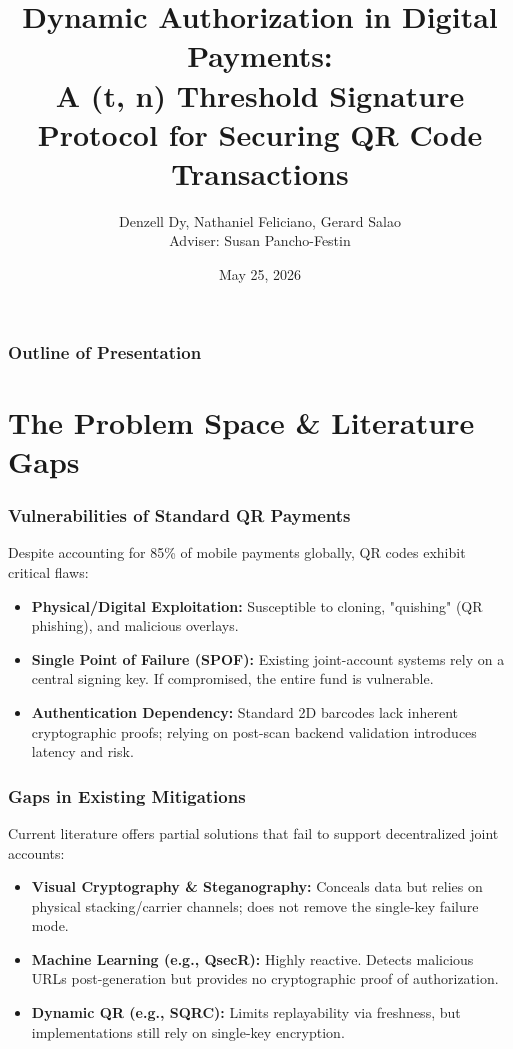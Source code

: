 \documentclass{beamer}
\title[Dynamic Authorization in Digital Payments]{Dynamic Authorization in Digital Payments: \\ A (t, n) Threshold Signature Protocol for Securing QR Code Transactions}
\author[Dy, Feliciano, Salao]{Denzell Dy, Nathaniel Feliciano, Gerard Salao \\ Adviser: Susan Pancho-Festin}
\institute[CSL - UP Diliman]{Computer Security Laboratory - Department of Computer Science \\ College of Engineering, University of the Philippines Diliman}
\date{May 25, 2026}
\begin{document}
\begin{frame}
  \titlepage
\end{frame}

\begin{frame}
  \frametitle{Outline of Presentation}
  \tableofcontents[hideallsubsections]
\end{frame}

\section{The Problem Space \& Literature Gaps}
\begin{frame}
  \frametitle{Vulnerabilities of Standard QR Payments}
  Despite accounting for 85\% of mobile payments globally, QR codes exhibit critical flaws:
  \vspace{0.3cm}
  \begin{itemize}
      \item \textbf{Physical/Digital Exploitation:} Susceptible to cloning, "quishing" (QR phishing), and malicious overlays.
      \item \textbf{Single Point of Failure (SPOF):} Existing joint-account systems rely on a central signing key. If compromised, the entire fund is vulnerable.
      \item \textbf{Authentication Dependency:} Standard 2D barcodes lack inherent cryptographic proofs; relying on post-scan backend validation introduces latency and risk.
  \end{itemize}
\end{frame}

\begin{frame}
  \frametitle{Gaps in Existing Mitigations}
  Current literature offers partial solutions that fail to support decentralized joint accounts:
  \vspace{0.3cm}
  \begin{itemize}
      \item \textbf{Visual Cryptography \& Steganography:} Conceals data but relies on physical stacking/carrier channels; does not remove the single-key failure mode.
      \item \textbf{Machine Learning (e.g., QsecR):} Highly reactive. Detects malicious URLs post-generation but provides no cryptographic proof of authorization.
      \item \textbf{Dynamic QR (e.g., SQRC):} Limits replayability via freshness, but implementations still rely on single-key encryption.
  \end{itemize}
\end{frame}
\end{document}
